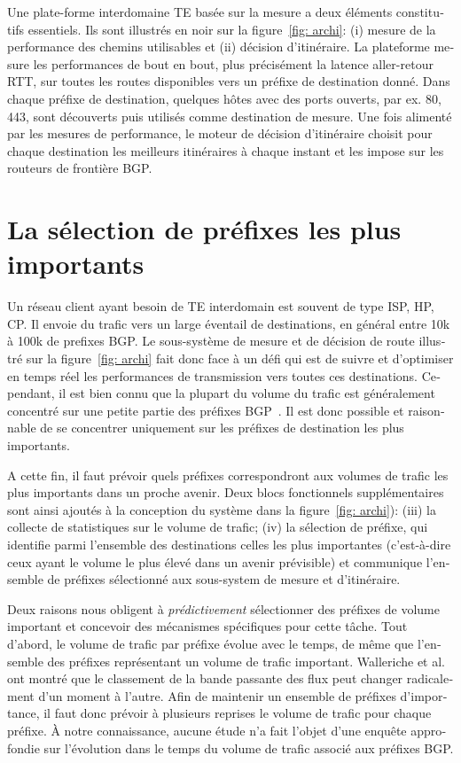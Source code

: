 \begin{otherlanguage}{french}
Une plate-forme interdomaine TE basée sur la mesure a deux éléments constitutifs essentiels.
Ils sont illustrés en noir sur la figure~\ref{fig: archi}: (i) mesure de la performance des chemins utilisables et (ii) décision d'itinéraire.
La plateforme mesure les performances de bout en bout, plus précisément la latence aller-retour \acf{RTT}, sur toutes les routes disponibles vers un préfixe de destination donné.
Dans chaque préfixe de destination, quelques hôtes avec des ports ouverts, par ex. 80, 443, sont découverts puis utilisés comme destination de mesure.
Une fois alimenté par les mesures de performance, le moteur de décision d'itinéraire choisit pour chaque destination les meilleurs itinéraires à chaque instant et les impose sur les routeurs de frontière BGP.

\section*{La sélection de préfixes les plus importants}

Un réseau client ayant besoin de \acf{TE} interdomain est souvent de type \acf{ISP}, \acf{HP}, \acf{CP}.
Il envoie du trafic vers un large éventail de destinations, en général entre 10k à 100k de prefixes BGP.
Le sous-système de mesure et de décision de route illustré sur la figure~\ref{fig: archi} fait donc face à un défi qui est de suivre et d'optimiser en temps réel les performances de transmission vers toutes ces destinations.
Cependant, il est bien connu que la plupart du volume du trafic est généralement concentré sur une petite partie des préfixes BGP~\cite {Fang1999, Feamster2003, Papagiannaki2005, Sarrar2012}.
Il est donc possible et raisonnable de se concentrer uniquement sur les préfixes de destination les plus importants.

A cette fin, il faut prévoir quels préfixes correspondront aux volumes de trafic les plus importants dans un proche avenir.
Deux blocs fonctionnels supplémentaires sont ainsi ajoutés à la conception du système dans la figure~\ref {fig: archi}): (iii) la collecte de statistiques sur le volume de trafic; (iv) la sélection de préfixe, qui identifie parmi l'ensemble des destinations celles les plus importantes (c'est-à-dire ceux ayant le volume le plus élevé dans un avenir prévisible) et communique l'ensemble de préfixes sélectionné aux sous-system de mesure et d'itinéraire.

Deux raisons nous obligent à \textit{prédictivement} sélectionner des préfixes de volume important et concevoir des mécanismes spécifiques pour cette tâche.
Tout d'abord, le volume de trafic par préfixe évolue avec le temps, de même que l'ensemble des préfixes représentant un volume de trafic important.
Walleriche et al.~\cite{Wallerich2006} ont montré que le classement de la bande passante des flux peut changer radicalement d'un moment à l'autre.
Afin de maintenir un ensemble de préfixes d'importance, il faut donc prévoir à plusieurs reprises le volume de trafic pour chaque préfixe.
À notre connaissance, aucune étude n'a fait l'objet d'une enquête approfondie sur l'évolution dans le temps du volume de trafic associé aux préfixes BGP.


\end{otherlanguage}
